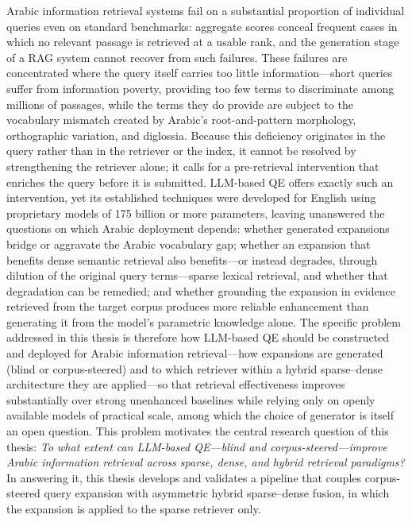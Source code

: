 Arabic information retrieval systems fail on a substantial proportion of individual queries even on standard benchmarks: aggregate scores conceal frequent cases in which no relevant passage is retrieved at a usable rank, and the generation stage of a RAG system cannot recover from such failures. These failures are concentrated where the query itself carries too little information---short queries suffer from information poverty, providing too few terms to discriminate among millions of passages, while the terms they do provide are subject to the vocabulary mismatch created by Arabic's root-and-pattern morphology, orthographic variation, and diglossia. Because this deficiency originates in the query rather than in the retriever or the index, it cannot be resolved by strengthening the retriever alone; it calls for a pre-retrieval intervention that enriches the query before it is submitted. LLM-based QE offers exactly such an intervention, yet its established techniques were developed for English using proprietary models of 175 billion or more parameters, leaving unanswered the questions on which Arabic deployment depends: whether generated expansions bridge or aggravate the Arabic vocabulary gap; whether an expansion that benefits dense semantic retrieval also benefits---or instead degrades, through dilution of the original query terms---sparse lexical retrieval, and whether that degradation can be remedied; and whether grounding the expansion in evidence retrieved from the target corpus produces more reliable enhancement than generating it from the model's parametric knowledge alone. The specific problem addressed in this thesis is therefore how LLM-based QE should be constructed and deployed for Arabic information retrieval---how expansions are generated (blind or corpus-steered) and to which retriever within a hybrid sparse--dense architecture they are applied---so that retrieval effectiveness improves substantially over strong unenhanced baselines while relying only on openly available models of practical scale, among which the choice of generator is itself an open question. This problem motivates the central research question of this thesis: \textit{To what extent can LLM-based QE---blind and corpus-steered---improve Arabic information retrieval across sparse, dense, and hybrid retrieval paradigms?} In answering it, this thesis develops and validates a pipeline that couples corpus-steered query expansion with asymmetric hybrid sparse--dense fusion, in which the expansion is applied to the sparse retriever only.

